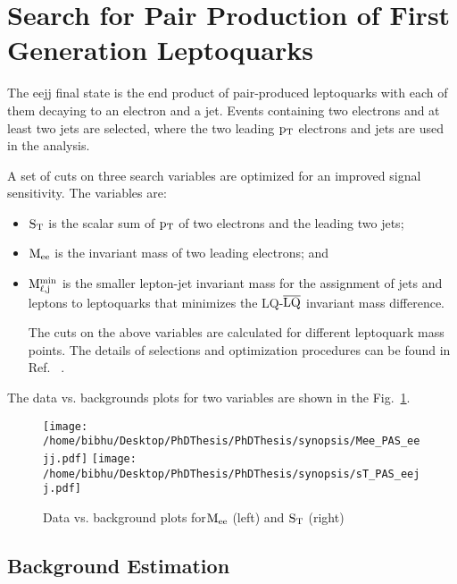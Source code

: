 \newpage
\section{Search for Pair Production of First Generation Leptoquarks}

The eejj final state is the end product of pair-produced leptoquarks with each of them decaying to an electron and a jet. Events containing  two electrons and at least two jets are selected, where the two leading $\rm p_{T}$ electrons and jets are used in the analysis.

A set  of cuts on three search variables are optimized for an improved signal sensitivity. The variables are:



\begin{itemize}
\item $\rm S_{T}$ is the scalar sum of $\rm p_{T}$ of two electrons and the leading two jets;

\item $\rm M_{ee}$ is the invariant mass of two leading electrons; and

\item $\rm M_{\ell ,j}^{min}$ is the smaller lepton-jet invariant mass for the assignment of jets and leptons to leptoquarks that minimizes the LQ-$\rm \overline{LQ}$ invariant mass difference.


The cuts on the above variables are calculated for different leptoquark mass points. The details of selections and optimization procedures can be found  in Ref. ~\cite{CMS-PAS-EXO-16-043}.



\end{itemize}

The data vs. backgrounds plots for two variables are shown in the Fig.~\ref{figure:DataVsMCinVariableLQ1}.
\begin{figure}[h]
\centering
\texttt{[image: /home/bibhu/Desktop/PhDThesis/PhDThesis/synopsis/Mee\_PAS\_eejj.pdf]}
\texttt{[image: /home/bibhu/Desktop/PhDThesis/PhDThesis/synopsis/sT\_PAS\_eejj.pdf]}
\caption{\label{figure:DataVsMCinVariableLQ1}Data vs. background plots for$\rm M_{ee}$ (left) and $\rm S_{T}$ (right) }
\end{figure}


\subsection{Background Estimation}


